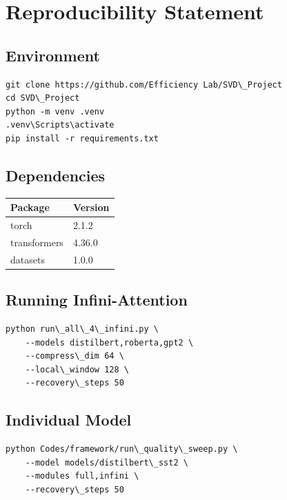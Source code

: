 
\section{Reproducibility Statement}

\subsection{Environment}

\begin{lstlisting}
git clone https://github.com/Efficiency Lab/SVD\_Project
cd SVD\_Project
python -m venv .venv
.venv\Scripts\activate
pip install -r requirements.txt
\end{lstlisting}

\subsection{Dependencies}

\begin{table}[H]
\centering
\small
\begin{tabular}{ll}
\toprule
\textbf{Package} & \textbf{Version} \\
\midrule
torch & 2.1.2 \\
transformers & 4.36.0 \\
datasets & 1.0.0 \\
\bottomrule
\end{tabular}
\end{table}

\subsection{Running Infini-Attention}

\begin{lstlisting}
python run\_all\_4\_infini.py \
    --models distilbert,roberta,gpt2 \
    --compress\_dim 64 \
    --local\_window 128 \
    --recovery\_steps 50
\end{lstlisting}

\subsection{Individual Model}

\begin{lstlisting}
python Codes/framework/run\_quality\_sweep.py \
    --model models/distilbert\_sst2 \
    --modules full,infini \
    --recovery\_steps 50
\end{lstlisting}

